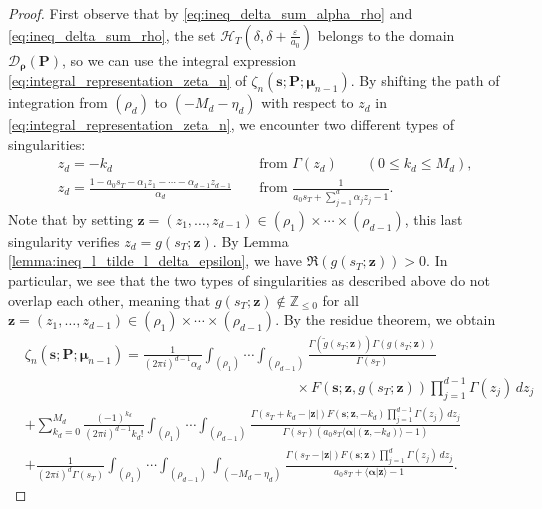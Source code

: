 \documentclass[a4paper,12pt]{article}
\theoremstyle{definition}
\numberwithin{equation}{section}
\newcommand{\dd}{d}
\newcommand{\ii}{i}
\begin{document}
\begin{proof}
First observe that by \eqref{eq:ineq_delta_sum_alpha_rho} and \eqref{eq:ineq_delta_sum_rho}, the set $\mathcal{H}_{T}(\delta,\delta+\frac{\varepsilon}{a_0})$ belongs to the domain $\mathcal{D}_{\boldsymbol{\rho}}(\mathbf{P})$, so we can use the integral expression \eqref{eq:integral_representation_zeta_n} of $\zeta_{n}(\mathbf{s};\mathbf{P};\boldsymbol{\mu}_{n-1})$. By shifting the path of integration from $(\rho_d)$ to $(-M_d-\eta_d)$ with respect to $z_d$ in \eqref{eq:integral_representation_zeta_n}, we encounter two different types of singularities:
\begin{align*}
    & z_d=-k_d && \text{ from } \Gamma(z_d) \qquad (0 \leq k_d \leq M_d), \\
    & z_d=\frac{1-a_0s_T-\alpha_1z_1-\cdots -\alpha_{d-1}z_{d-1}}{\alpha_d} && \text{ from } \frac{1}{a_0s_T+\sum_{j=1}^d \alpha_j z_j -1}.
\end{align*}
Note that by setting $\mathbf{z}=(z_1,\ldots,z_{d-1}) \in (\rho_1) \times \cdots \times (\rho_{d-1})$, this last singularity verifies $z_d=g(s_T;\mathbf{z})$. By Lemma \ref{lemma:ineq_l_tilde_l_delta_epsilon}, we have $\Re(g(s_T;\mathbf{z}))>0$. In particular, we see that the two types of singularities as described above do not overlap each other, meaning that $g(s_T;\mathbf{z}) \not \in \mathbb{Z}_{\leq 0}$ for all $\mathbf{z}=(z_1,\ldots,z_{d-1}) \in (\rho_1) \times \cdots \times (\rho_{d-1})$. By the residue theorem, we obtain
\begin{align*}
     &\zeta_{n}(\mathbf{s};\mathbf{P};\boldsymbol{\mu}_{n-1}) =\frac{1}{(2\pi \ii)^{d-1}\alpha_d}\int_{(\rho_{1})} \cdots \int_{(\rho_{d-1})} \frac{\Gamma(\widetilde{g}(s_T;\mathbf{z})) \Gamma(g(s_T;\mathbf{z}))}{\Gamma(s_T)} \\
    & \hspace{232pt} \times F(\mathbf{s};\mathbf{z},g(s_T;\mathbf{z})) \prod_{j=1}^{d-1} \Gamma(z_j) \, \dd z_{j} \\
    &+ \sum_{k_d=0}^{M_d}\frac{(-1)^{k_d}}{(2\pi \ii)^{d-1} k_d!} \int_{(\rho_1)} \cdots \int_{(\rho_{d-1})} \frac{\Gamma(s_T+k_d-|\mathbf{z}|)F(\mathbf{s};\mathbf{z},-k_d)\prod_{j=1}^{d-1} \Gamma(z_j) \, \dd z_{j}}{\Gamma(s_T) (a_0s_T\langle \boldsymbol{\alpha}|(\mathbf{z},-k_d) \rangle-1)} \\
    & + \frac{1}{(2\pi \ii)^d\Gamma(s_T)} \int_{(\rho_{1})} \cdots \int_{(\rho_{d-1})}\int_{(-M_d-\eta_d)} \frac{\Gamma(s_T-|\mathbf{z}|)F(\mathbf{s};\mathbf{z})\prod_{j=1}^d \Gamma(z_j) \, \dd z_j}{a_0s_T+\langle \boldsymbol{\alpha}|\mathbf{z} \rangle -1}.

\end{align*}
\end{proof}
\end{document}
